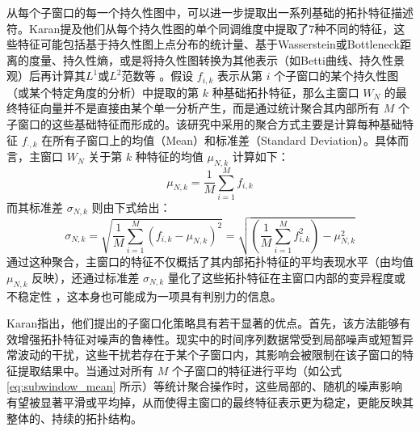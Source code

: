 从每个子窗口的每一个持久性图中，可以进一步提取出一系列基础的拓扑特征描述符。Karan提及他们从每个持久性图的单个同调维度中提取了7种不同的特征，这些特征可能包括基于持久性图上点分布的统计量、基于Wasserstein或Bottleneck距离的度量、持久性熵，或是将持久性图转换为其他表示（如Betti曲线、持久性景观）后再计算其$L^1$或$L^2$范数等 。假设 $f_{i,k}$ 表示从第 $i$ 个子窗口的某个持久性图（或某个特定角度的分析）中提取的第 $k$ 种基础拓扑特征，那么主窗口 $W_N$ 的最终特征向量并不是直接由某个单一分析产生，而是通过统计聚合其内部所有 $M$ 个子窗口的这些基础特征而形成的。该研究中采用的聚合方式主要是计算每种基础特征 $f_{\cdot,k}$ 在所有子窗口上的均值（Mean）和标准差（Standard Deviation）。具体而言，主窗口 $W_N$ 关于第 $k$ 种特征的均值 $\mu_{N,k}$ 计算如下：
\begin{equation}
    \mu_{N,k} = \frac{1}{M} \sum_{i=1}^{M} f_{i,k}
    \label{eq:subwindow_mean}
\end{equation}
而其标准差 $\sigma_{N,k}$ 则由下式给出：
\begin{equation}
    \sigma_{N,k} = \sqrt{\frac{1}{M}\sum_{i=1}^{M}(f_{i,k} - \mu_{N,k})^2} = \sqrt{\left(\frac{1}{M}\sum_{i=1}^{M}f_{i,k}^2\right) - \mu_{N,k}^2}
    \label{eq:subwindow_std}
\end{equation}
通过这种聚合，主窗口的特征不仅概括了其内部拓扑特征的平均表现水平（由均值 $\mu_{N,k}$ 反映），还通过标准差 $\sigma_{N,k}$ 量化了这些拓扑特征在主窗口内部的变异程度或不稳定性 ，这本身也可能成为一项具有判别力的信息。

Karan指出，他们提出的子窗口化策略具有若干显著的优点。首先，该方法能够有效增强拓扑特征对噪声的鲁棒性。现实中的时间序列数据常受到局部噪声或短暂异常波动的干扰，这些干扰若存在于某个子窗口内，其影响会被限制在该子窗口的特征提取结果中。当通过对所有 $M$ 个子窗口的特征进行平均（如公式 \ref{eq:subwindow_mean} 所示）等统计聚合操作时，这些局部的、随机的噪声影响有望被显著平滑或平均掉，从而使得主窗口的最终特征表示更为稳定，更能反映其整体的、持续的拓扑结构。

